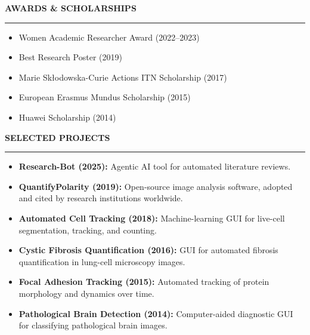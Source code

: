 \documentclass[10pt,a4paper]{article}
\newcommand{\cvsection}[1]{%
  \vspace{0.8em}%
  {\large\bfseries\color{heading}#1}\par
  \vspace{-0.35em}%
  {\color{heading}\rule{\textwidth}{0.6pt}}\par
  \vspace{0.1em}%
}
\begin{document}
\cvsection{AWARDS \& SCHOLARSHIPS}

\begin{itemize}
  \item Women Academic Researcher Award (2022--2023)
  \item Best Research Poster (2019)
  \item Marie Skłodowska-Curie Actions ITN Scholarship (2017)
  \item European Erasmus Mundus Scholarship (2015)
  \item Huawei Scholarship (2014)
\end{itemize}

\label{sec:projects}
\cvsection{SELECTED PROJECTS}

\begin{itemize}
  \item \textbf{Research-Bot (2025):} Agentic AI tool for automated literature reviews.
  \item \textbf{QuantifyPolarity (2019):} Open-source image analysis software, adopted and cited by research institutions worldwide.
  \item \textbf{Automated Cell Tracking (2018):} Machine-learning GUI for live-cell segmentation, tracking, and counting.
  \item \textbf{Cystic Fibrosis Quantification (2016):} GUI for automated fibrosis quantification in lung-cell microscopy images.
  \item \textbf{Focal Adhesion Tracking (2015):} Automated tracking of protein morphology and dynamics over time.
  \item \textbf{Pathological Brain Detection (2014):} Computer-aided diagnostic GUI for classifying pathological brain images.
\end{itemize}
\end{document}
